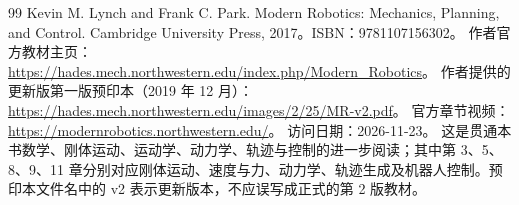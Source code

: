 \begin{thebibliography}{99}
Kevin M. Lynch and Frank C. Park.
Modern Robotics: Mechanics, Planning, and Control.
Cambridge University Press, 2017。ISBN：9781107156302。
作者官方教材主页：
\url{https://hades.mech.northwestern.edu/index.php/Modern_Robotics}。
作者提供的更新版第一版预印本（2019 年 12 月）：
\url{https://hades.mech.northwestern.edu/images/2/25/MR-v2.pdf}。
官方章节视频：\url{https://modernrobotics.northwestern.edu/}。
访问日期：2026-11-23。
这是贯通本书数学、刚体运动、运动学、动力学、轨迹与控制的进一步阅读；其中第 3、5、8、9、11 章分别对应刚体运动、速度与力、动力学、轨迹生成及机器人控制。预印本文件名中的 v2 表示更新版本，不应误写成正式的第 2 版教材。

\end{thebibliography}
\endgroup
